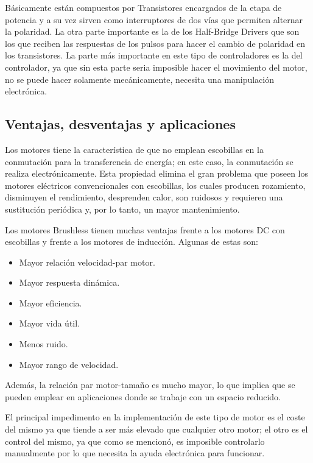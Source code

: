 \documentclass[../main]{subfiles}
\begin{document}
Básicamente están compuestos por Transistores encargados de la etapa de potencia y a su vez sirven como interruptores de dos vías que permiten alternar la polaridad. La otra parte importante es la de los Half-Bridge Drivers que son los que reciben las respuestas de los pulsos para hacer el cambio de polaridad en los transistores. La parte más importante en este tipo de controladores es la del controlador, ya que sin esta parte seria imposible hacer el movimiento del motor, no se puede hacer solamente mecánicamente, necesita una manipulación electrónica.


\subsection{Ventajas, desventajas y aplicaciones}
Los motores tiene la característica de que no emplean escobillas en la conmutación para la transferencia de energía; en este caso, la conmutación se realiza electrónicamente. Esta propiedad elimina el gran problema que poseen los motores eléctricos convencionales con escobillas, los cuales producen rozamiento, disminuyen el rendimiento, desprenden calor, son ruidosos y requieren una sustitución periódica y, por lo tanto, un mayor mantenimiento.

Los motores Brushless tienen muchas ventajas frente a los motores DC con escobillas y frente a los motores de inducción. Algunas de estas son:
\begin{itemize}
\item Mayor relación velocidad-par motor.

\item Mayor respuesta dinámica.

\item Mayor eficiencia.

\item Mayor vida útil.

\item Menos ruido.

\item Mayor rango de velocidad.

\end{itemize}
Además, la relación par motor-tamaño es mucho mayor, lo que implica que se pueden emplear en aplicaciones donde se trabaje con un espacio reducido.


El principal impedimento en la implementación de este tipo de motor es el coste del mismo ya que tiende a ser más elevado que cualquier otro motor; el otro es el control del mismo, ya que como se mencionó, es imposible controlarlo manualmente por lo que necesita la ayuda electrónica para funcionar.
\end{document}
